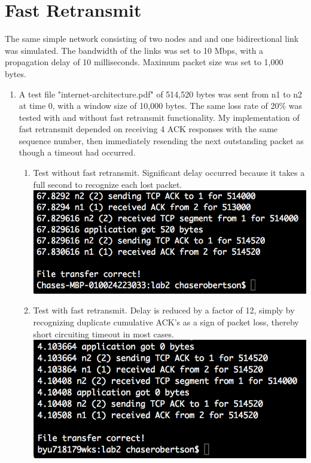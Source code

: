 \documentclass[fleqn,11pt]{article}
\begin{document}
\section{Fast Retransmit}

The same simple network consisting of two nodes and and one bidirectional link was simulated. The bandwidth of the links was set to 10 Mbps, with a propagation delay of 10 milliseconds. Maximum packet size was set to 1,000 bytes.

\begin{enumerate}
\item A test file "internet-architecture.pdf" of 514,520 bytes was sent from n1 to n2 at time 0, with a window size of 10,000 bytes. The same loss rate of 20\% was tested with and without fast retransmit functionality. My implementation of fast retransmit depended on receiving 4 ACK responses with the same sequence number, then immediately resending the next outstanding packet as though a timeout had occurred.

\begin{enumerate}
\item Test without fast retransmit. Significant delay occurred because it takes a full second to recognize each lost packet. \\
\includegraphics{withoutretransmit.png}

\item Test with fast retransmit. Delay is reduced by a factor of 12, simply by recognizing duplicate cumulative ACK's as a sign of packet loss, thereby short circuiting timeout in most cases. \\
\includegraphics{withretransmit.png}
\end{enumerate}

\end{enumerate}
\end{document}
